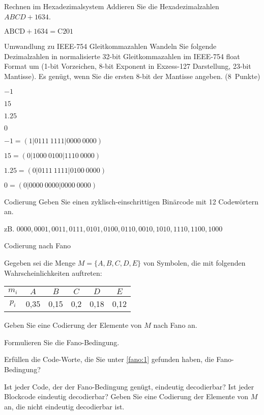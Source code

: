 \documentclass{exercisesheet}
\begin{document}
\begin{exercise}{Rechnen im Hexadezimalsystem}
  Addieren Sie die Hexadezimalzahlen $ABCD + 1634$.\points[4]

  \begin{solution}
    $\mathrm{ABCD} + \mathrm{1634} = \mathrm{C201}$
  \end{solution}
\end{exercise}

\begin{eexercises}{Umwandlung zu IEEE-754 Gleitkommazahlen}{
    Wandeln Sie folgende Dezimalzahlen in normalisierte 32-bit Gleitkommazahlen im IEEE-754 float Format um (1-bit Vorzeichen, 8-bit Exponent in Exzess-127 Darstellung, 23-bit Mantisse). Es genügt, wenn Sie die ersten 8-bit der Mantisse angeben. (8~Punkte)
  }
  \item $-1$
  \item $15$
  \item $1.25$
  \item $0$
\end{eexercises}

\begin{solutions}
  \item $-1 = (1|0111\ 1111|0000\ 0000)$
  \item $15 = (0|1000\ 0100|1110\ 0000)$
  \item $1.25 = (0|0111\ 1111|0100\ 0000)$
  \item $0 = (0|0000\ 0000|0000\ 0000)$
\end{solutions}

\begin{exercise}{Codierung}
  Geben Sie einen zyklisch-einschrittigen Binärcode mit 12 Codewörtern an.\points[5]

  \begin{solution}
    zB. $0000, 0001, 0011, 0111, 0101, 0100, 0110, 0010, 1010, 1110, 1100, 1000$
  \end{solution}
\end{exercise}

\begin{eexercises}{Codierung nach Fano}{
    Gegeben sei die Menge $M = \{A, B, C, D, E\}$ von Symbolen, die mit folgenden Wahrscheinlichkeiten auftreten:
    \centering\begin{tabular}{c|ccccc}
      $m_i$ & $A$  & $B$  & $C$ & $D$  & $E$  \\
      \hline
      $p_i$ & 0,35 & 0,15 & 0,2 & 0,18 & 0,12 \\
    \end{tabular}
  }
  \item\label{fano:1} Geben Sie eine Codierung der Elemente von $M$ nach Fano an.\points[7]
  \item Formulieren Sie die Fano-Bedingung.\points
  \item Erfüllen die Code-Worte, die Sie unter \ref{fano:1} gefunden haben, die Fano-Bedingung?\points
  \item Ist jeder Code, der der Fano-Bedingung genügt, eindeutig decodierbar? Ist jeder Blockcode eindeutig decodierbar? Geben Sie eine Codierung der Elemente von $M$ an, die nicht eindeutig decodierbar ist.\points[3]
\end{eexercises}
\end{document}
